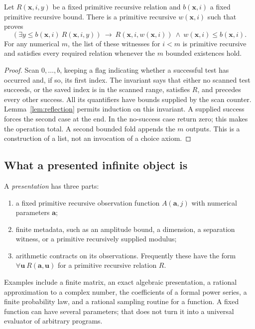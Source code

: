 \begin{lemma}
\label{lem:bounded-choice}
Let $R(\mathbf x,i,y)$ be a fixed primitive recursive relation and
$b(\mathbf x,i)$ a fixed primitive recursive bound. There is a primitive
recursive $w(\mathbf x,i)$ such that \iPRA{} proves
\[
 (\exists y\le b(\mathbf x,i)\ R(\mathbf x,i,y))
 \ \longrightarrow\ R(\mathbf x,i,w(\mathbf x,i))
       \ \wedge\ w(\mathbf x,i)\le b(\mathbf x,i).
\]
For any numerical $m$, the list of these witnesses for $i<m$ is primitive
recursive and satisfies every required relation whenever the $m$ bounded
existences hold.
\end{lemma}
\begin{proof}
Scan $0,\ldots,b$, keeping a flag indicating whether a successful test
has occurred and, if so, its first index. The invariant says that either
no scanned test succeeds, or the saved index is in the scanned range,
satisfies $R$, and precedes every other success. All its quantifiers have
bounds supplied by the scan counter. Lemma~\ref{lem:reflection} permits
induction on this invariant. A supplied success forces the second case
at the end. In the no-success case return zero; this makes the operation
total. A second bounded fold appends the $m$ outputs. This is a construction
of a list, not an invocation of a choice axiom.
\end{proof}

\subsection{What a presented infinite object is}

A \emph{presentation} has three parts:
\begin{enumerate}
\item a fixed primitive recursive observation function
      $A(\mathbf a,j)$ with numerical parameters $\mathbf a$;
\item finite metadata, such as an amplitude bound, a dimension, a
      separation witness, or a primitive recursively supplied modulus;
\item arithmetic contracts on its observations. Frequently these have the
      form $\forall\mathbf u\ R(\mathbf a,\mathbf u)$ for a primitive
      recursive relation $R$.
\end{enumerate}
Examples include a finite matrix, an exact algebraic presentation, a
rational approximation to a complex number, the coefficients of a formal
power series, a finite probability law, and a rational sampling routine
for a function. A fixed function can have several parameters; that does
not turn it into a universal evaluator of arbitrary programs.

